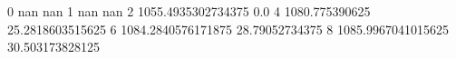 0 nan nan
1 nan nan
2 1055.4935302734375 0.0
4 1080.775390625 25.2818603515625
6 1084.2840576171875 28.79052734375
8 1085.9967041015625 30.503173828125
